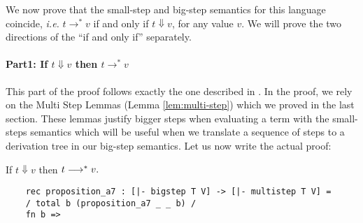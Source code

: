 We now prove that the small-step and big-step semantics for this language
coincide, {\em i.e.} $t \rightarrow^* v$ if and only if $t \Downarrow v$, for
any value $v$.
We will prove the two directions of the ``if and only if'' separately.

\paragraph{Part1: If $t \Downarrow v$ then $t \rightarrow^* v$}
This part of the proof follows exactly the one described in
\cite{TAPL}. In the proof, we rely on the Multi Step Lemmas (Lemma
\ref{lem:multi-step}) which we proved in the last section. These
lemmas justify bigger steps when evaluating a term with the
small-steps semantics which will be useful when we translate a
sequence of steps to a derivation tree in our big-step semantics. 
Let us now write the actual proof:

\begin{proposition}
  If $t \Downarrow v$ then $t \longrightarrow^* v.$
  \begin{lstlisting}
    rec proposition_a7 : [|- bigstep T V] -> [|- multistep T V] =
    / total b (proposition_a7 _ _ b) /
    fn b =>
  \end{lstlisting}
\end{proposition}

